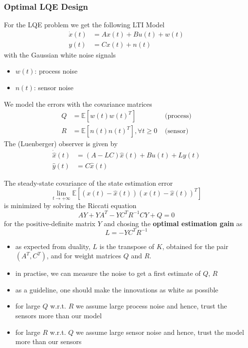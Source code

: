 \subsubsection{Optimal LQE Design}
For the LQE problem we get the following LTI Model
\begin{align*}
    \dot{x}(t) & = Ax(t)+Bu(t)+w(t) \\
    y(t)       & = Cx(t)+n(t)
\end{align*}
with the Gaussian white noise signals
\begin{itemize}
    \item $w(t)$: process noise
    \item $n(t)$: sensor noise
\end{itemize}
We model the errors with the covariance matrices
\begin{align*}
    Q & =\mathbb{E}[w(t)w(t)^T]                 & \text{ (process)} \\
    R & =\mathbb{E}[n(t)n(t)^T], \forall t\geq0 & \text{ (sensor)}
\end{align*}
The (Luenberger) observer is given by
\begin{align*}
    \dot{\hat{x}}(t) & =(A-LC)\hat{x}(t)+Bu(t)+Ly(t) \\
    \hat{y}(t)       & =C\hat{x}(t)
\end{align*}


The steady-state covariance of the state estimation error
\begin{equation*}
    \lim_{t\to+\infty}\mathbb{E}\left[(x(t)-\hat{x}(t))(x(t)-\hat{x}(t))^T\right]
\end{equation*}
is minimized by solving the Riccati equation
\begin{equation*}
    AY+YA^T-YC^TR^{-1}CY+Q=0
\end{equation*}
for the positive-definite matrix $Y$ and chosing the \textbf{optimal estimation gain} as
\begin{equation*}
    L=-YC^T R^{-1}
\end{equation*}


\begin{itemize}
    \item as expected from duality, $L$ is the transpose of $K$, obtained for the pair $(A^T, C^T)$, and for weight matrices $Q$ and $R$.
    \item in practise, we can measure the noise to get a first estimate of $Q$, $R$
    \item as a guideline, one should make the innovations as white as possible
    \item for large $Q$ w.r.t. $R$ we assume large process noise and hence, trust the sensors more than our model
    \item for large $R$ w.r.t. $Q$ we assume large sensor noise and hence, trust the model more than our sensors
\end{itemize}
